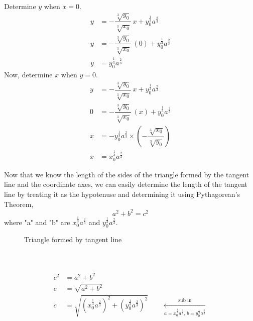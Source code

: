 \documentclass[12pt]{book}
\begin{document}
\begin{enumerate}
Determine $y$ when $x=0$.
\begin{align}
    y &= -\dfrac{\sqrt[3]{y_0}}{\sqrt[3]{x_0}}\,x + y_0^{\frac{1}{3}}a^{\frac{2}{3}} \\
    y &= -\dfrac{\sqrt[3]{y_0}}{\sqrt[3]{x_0}}\,(0) + y_0^{\frac{1}{3}}a^{\frac{2}{3}} \\
    y &= y_0^{\frac{1}{3}}a^{\frac{2}{3}}
\end{align}
Now, determine $x$ when $y=0$.
\begin{align}
    y &= -\dfrac{\sqrt[3]{y_0}}{\sqrt[3]{x_0}}\,x + y_0^{\frac{1}{3}}a^{\frac{2}{3}} \\
    0 &= -\dfrac{\sqrt[3]{y_0}}{\sqrt[3]{x_0}}\,(x) + y_0^{\frac{1}{3}}a^{\frac{2}{3}} \\
    x &= -y_0^{\frac{1}{3}}a^{\frac{2}{3}} \times \left(-\dfrac{\sqrt[3]{x_0}}{\sqrt[3]{y_0}}\right) \\
    x &= x_0^{\frac{1}{3}}a^{\frac{2}{3}}
\end{align}
\begin{minipage}{0.5\textwidth}
    Now that we know the length of the sides of the triangle formed by the tangent line and the coordinate axes, we can easily determine the length of the tangent line by treating it as the hypotenuse and determining it using Pythagorean's Theorem,
    $$a^2+b^2=c^2$$
    where "a" and "b" are $x_0^{\frac{1}{3}}a^{\frac{2}{3}}$ and $y_0^{\frac{1}{3}}a^{\frac{2}{3}}$.
\end{minipage}
\begin{minipage}{0.5\textwidth}
    \begin{figure}[H] %
    \caption{Triangle formed by tangent line}
    \end{figure}
\end{minipage}\\\\
\begin{align}
    c^2 &= a^2 + b^2 \\
    c &= \sqrt{a^2 + b^2} \\
    c &= \sqrt{\left(x_0^{\frac{1}{3}}a^{\frac{2}{3}}\right)^2 + \left(y_0^{\frac{1}{3}}a^{\frac{2}{3}}\right)^2} \qquad \xleftarrow[\text{$a=x_0^{\frac{1}{3}}a^{\frac{2}{3}}$, $b=y_0^{\frac{1}{3}}a^{\frac{2}{3}}$}]{\text{sub in}}\\

\end{align}
\end{enumerate}
\end{document}
